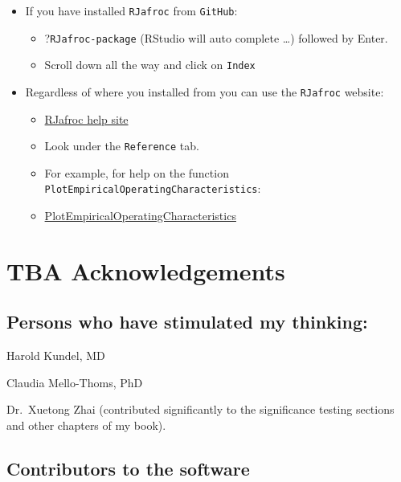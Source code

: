 \documentclass[
]{book}
\providecommand{\tightlist}{%
  \setlength{\itemsep}{0pt}\setlength{\parskip}{0pt}}
\begin{document}
\begin{itemize}
\tightlist
\item
  If you have installed \texttt{RJafroc} from \texttt{GitHub}:

  \begin{itemize}
  \tightlist
  \item
    ?\texttt{RJafroc-package} (RStudio will auto complete \ldots) followed by Enter.
  \item
    Scroll down all the way and click on \texttt{Index}
  \end{itemize}
\item
  Regardless of where you installed from you can use the \texttt{RJafroc} website:

  \begin{itemize}
  \tightlist
  \item
    \href{https://dpc10ster.github.io/RJafroc/}{RJafroc help site}
  \item
    Look under the \texttt{Reference} tab.
  \item
    For example, for help on the function \texttt{PlotEmpiricalOperatingCharacteristics}:
  \item
    \href{https://dpc10ster.github.io/RJafroc/reference/PlotEmpiricalOperatingCharacteristics.html}{PlotEmpiricalOperatingCharacteristics}
  \end{itemize}
\end{itemize}

\hypertarget{quick-start-index-acknowledgements}{%
\section{TBA Acknowledgements}\label{quick-start-index-acknowledgements}}

\hypertarget{persons-who-have-stimulated-my-thinking}{%
\subsection{Persons who have stimulated my thinking:}\label{persons-who-have-stimulated-my-thinking}}

Harold Kundel, MD

Claudia Mello-Thoms, PhD

Dr.~Xuetong Zhai (contributed significantly to the significance testing sections and other chapters of my book).

\hypertarget{quick-start-index-contributors}{%
\subsection{Contributors to the software}\label{quick-start-index-contributors}}
\end{document}
